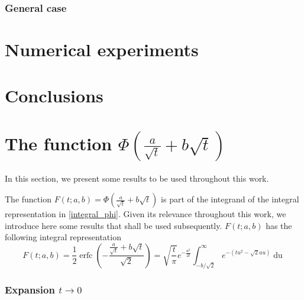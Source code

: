 \documentclass[10pt,a4paper,oneside]{article}
\DeclareMathOperator{\erfc}{erfc}
\numberwithin{equation}{section}
\begin{document}
\subsubsection{General case}


\section{Numerical experiments}

\section{Conclusions}

\appendix
\section{The function $\Phi\left(\frac{a}{\sqrt{t}} + b\sqrt{t}\right)$}
In this section, we present some results to be used throughout this work.

The function $F(t; a, b) = \Phi\left(\frac{a}{\sqrt{t}} + b\sqrt{t}\right)$ is part of the integrand of the integral representation in \eqref{integral_phi}. Given its relevance throughout this work, we introduce here some results that shall be used subsequently. $F(t; a, b)$ has the following integral representation \cite[\S 7.7.6]{NIST:DLMF}
\begin{equation}\label{integral_erfc_ab}
F(t; a, b) = \frac{1}{2}\erfc\left(-\frac{\frac{a}{\sqrt{t}} + b\sqrt{t}}{\sqrt{2}}\right)  = \sqrt{\frac{t}{\pi}} e^{-\frac{a^2}{2t}} \int_{-b/\sqrt{2}}^{\infty} e^{-(tu^2 - \sqrt{2}au)} \mathop{du}
\end{equation}

\subsubsection{Expansion $t \to 0$}
\end{document}

